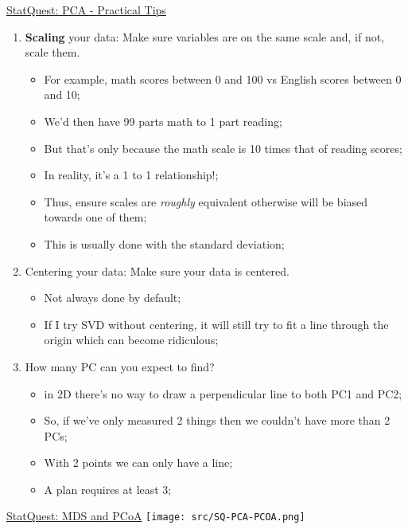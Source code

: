 \documentclass[12pt, titlepage, french]{report}
\begin{document}
\begin{YTB_SUMM}{\href{https://www.youtube.com/watch?v=oRvgq966yZg&list=PLblh5JKOoLUICTaGLRoHQDuF_7q2GfuJF&index=24}{StatQuest: PCA - Practical Tips}}
\begin{enumerate}
	\item	\textbf{Scaling} your data: Make sure variables are on the same scale and, if not, scale them.
		\begin{itemize}
		\item	For example, math scores between 0 and 100 vs English scores between 0 and 10;
		\item	We'd then have 99 parts math to 1 part reading;
		\item	But that's only because the math scale is 10 times that of reading scores;
		\item	In reality, it's a 1 to 1 relationship!;
		\item	Thus, ensure scales are \textit{roughly} equivalent otherwise will be biased towards one of them;
		\item	This is usually done with the standard deviation;
		\end{itemize}
	\item	Centering your data: Make sure your data is centered.
		\begin{itemize}
		\item	Not always done by default;
		\item	If I try SVD without centering, it will still try to fit a line through the origin which can become ridiculous;
		\end{itemize}
	\item	How many PC can you expect to find?
		\begin{itemize}
		\item	in 2D there's no way to draw a perpendicular line to both PC1 and PC2;
		\item	So, if we've only measured 2 things then we couldn't have more than 2 PCs;
		\item	With 2 points we can only have a line;
		\item	A plan requires at least 3;
		
		\end{itemize}
\end{enumerate}
\end{YTB_SUMM}

\begin{YTB_SUMM}[label = MDS-PCOA]{\href{https://www.youtube.com/watch?v=GEn-_dAyYME}{StatQuest: MDS and PCoA}}
\texttt{[image: src/SQ-PCA-PCOA.png]}
\end{YTB_SUMM}
\end{document}
